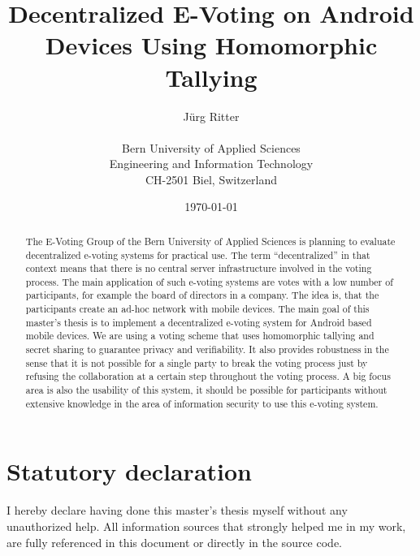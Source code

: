 \documentclass[numbers=noenddot, abstract=on, a4paper, headsepline,
footsepline, oneside, draft=off]{scrreprt}
\begin{document}
\title{\bf Decentralized E-Voting on Android Devices Using Homomorphic Tallying}
\subject{Master's Thesis}
\author{Jürg Ritter\\
\\
Bern University of Applied Sciences\\
Engineering and Information Technology\\
CH-2501 Biel, Switzerland\\
}
\date{\today}
\publishers{Advisor:\\
Prof. Dr. Rolf Haenni, Bern University of Applied Sciences\\
\bigskip
Expert:\\
Stephan Neumann, Technical University of Darmstadt}
\maketitle

\clearpage
{}

\begin{abstract}
The E-Voting Group of the Bern University of Applied Sciences is planning to
evaluate decentralized e-voting systems for practical use. The term
``decentralized'' in that context means that there is no central server
infrastructure involved in the voting process. The main application of such
e-voting systems are votes with a low number of participants, for example the
board of directors in a company. The idea is, that the participants create an
ad-hoc network with mobile devices. The main goal of this master's thesis is to
implement a decentralized e-voting system for Android based mobile devices. We
are using a voting scheme that uses homomorphic tallying and secret sharing to
guarantee privacy and verifiability. It also provides robustness in the sense
that it is not possible for a single party to break the voting process just by
refusing the collaboration at a certain step throughout the voting process. A
big focus area is also the usability of this system, it should be possible for
participants without extensive knowledge in the area of information security to
use this e-voting system.
\end{abstract}

\chapter*{Statutory declaration}
\label{chap:decalration}

I hereby declare having done this master's thesis myself without any
unauthorized help. All information sources that strongly helped me in my work,
are fully referenced in this document or directly in the source code.
\end{document}
